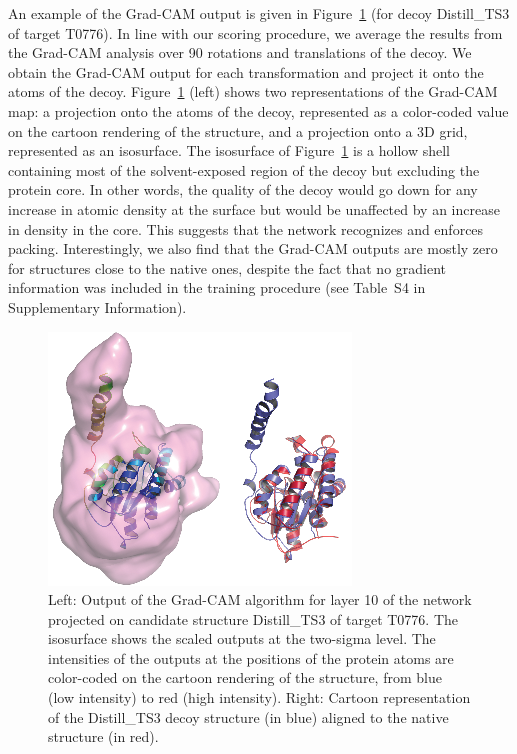 \documentclass{bioinfo}
\begin{document}
An example of the Grad-CAM output is given in
Figure~\ref{Fig:GradCAMT0776} (for decoy Distill\_TS3 of target
T0776).  In line with our scoring procedure, we average the results
from the Grad-CAM analysis over 90 rotations and translations of the
decoy. We obtain the Grad-CAM output for each transformation and
project it onto the atoms of the decoy.  Figure~\ref{Fig:GradCAMT0776}
(left) shows two representations of the Grad-CAM map: a projection
onto the atoms of the decoy, represented as a color-coded value on the
cartoon rendering of the structure, and a projection onto a 3D grid,
represented as an isosurface. The isosurface of
Figure~\ref{Fig:GradCAMT0776} is a hollow shell containing most of the
solvent-exposed region of the decoy but excluding the protein core. In
other words, the quality of the decoy would go down for any increase
in atomic density at the surface but would be unaffected by an
increase in density in the core. This suggests that the network
recognizes and enforces packing.  Interestingly, we also find that the
Grad-CAM outputs are mostly zero for structures close to the native
ones, despite the fact that no gradient information was included in
the training procedure (see Table~S4 in Supplementary Information).
%
\begin{figure}[H]
    \centering
    \includegraphics[width=\linewidth]{image6}
    \caption{Left: Output of the Grad-CAM algorithm for layer 10 of
      the network projected on candidate structure Distill\_TS3 of
      target T0776. The isosurface shows the scaled outputs at the
      two-sigma level. The intensities of the outputs at the positions
      of the protein atoms are color-coded on the cartoon rendering of
      the structure, from blue (low intensity) to red (high
      intensity). Right: Cartoon representation of the Distill\_TS3
      decoy structure (in blue) aligned to the native structure (in
      red).}
    \label{Fig:GradCAMT0776}
\end{figure}
\end{document}
